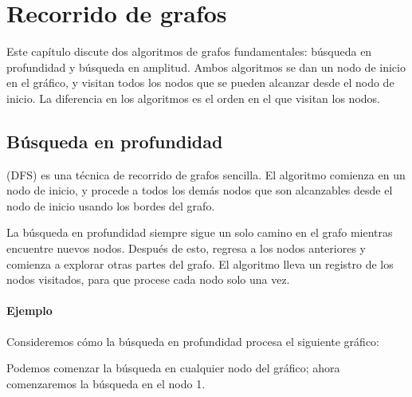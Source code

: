 \chapter{Recorrido de grafos}

Este capítulo discute dos algoritmos de grafos fundamentales:
búsqueda en profundidad y búsqueda en amplitud.
Ambos algoritmos se dan un nodo de inicio
en el gráfico,
y visitan todos los nodos que se pueden alcanzar
desde el nodo de inicio.
La diferencia en los algoritmos es el orden
en el que visitan los nodos.

\section{Búsqueda en profundidad}


 (DFS)
es una técnica de recorrido de grafos sencilla.
El algoritmo comienza en un nodo de inicio,
y procede a todos los demás nodos que son
alcanzables desde el nodo de inicio usando
los bordes del grafo.

La búsqueda en profundidad siempre sigue un solo
camino en el grafo mientras encuentre
nuevos nodos.
Después de esto, regresa a los nodos anteriores
y comienza a explorar otras partes del grafo.
El algoritmo lleva un registro de los nodos visitados,
para que procese cada nodo solo una vez.

\subsubsection*{Ejemplo}

Consideremos cómo la búsqueda en profundidad procesa
el siguiente gráfico:
\begin{center}
\end{center}
Podemos comenzar la búsqueda en cualquier nodo del gráfico;
ahora comenzaremos la búsqueda en el nodo 1.

